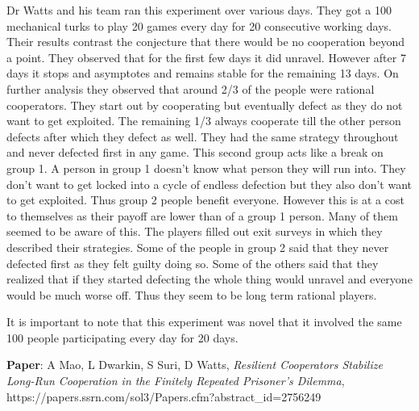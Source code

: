 Dr Watts and his team ran this experiment over various days. They got a 100 mechanical turks to play 20 games every day for 20 consecutive working days. Their results contrast the conjecture that there would be no cooperation beyond a point. They observed that for the first few days it did unravel. However after 7 days it stops and asymptotes and remains stable for the remaining 13 days. On further analysis they observed that around 2/3 of the people were rational cooperators. They start out by cooperating but eventually defect as they do not want to get exploited. The remaining 1/3 always cooperate till the other person defects after which they defect as well. They had the same strategy throughout and  never defected first in any game. This second group acts like a break on group 1. A person in group 1 doesn't know what person they will run into. They don't want to get locked into a cycle of endless defection but they also don't want to get exploited. Thus group 2 people benefit everyone. However this is at a cost to themselves as their payoff are lower than of a group 1 person. Many of them seemed to be aware of this. The players filled out exit surveys in which they described their strategies. Some of the people in group 2 said that they never defected first as they felt guilty doing so. Some of the others said that they realized that if they started defecting the whole thing would unravel and everyone would be much worse off. Thus they seem to be long term rational players.

It is important to note that this experiment was novel that it involved the same 100 people participating every day for 20 days.

\textbf{Paper}: A Mao, L Dwarkin, S Suri, D Watts,
\textit{Resilient Cooperators Stabilize Long-Run Cooperation in the Finitely Repeated Prisoner's Dilemma}, https://papers.ssrn.com/sol3/Papers.cfm?abstract\_id=2756249
